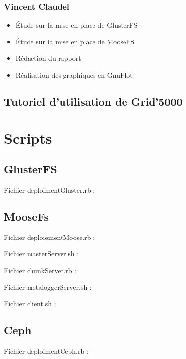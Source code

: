 \documentclass[12pt]{report}
\begin{document}
				\subsection{Vincent Claudel}
					\begin{itemize}
						\item Étude sur la mise en place de GlusterFS
						\item Étude sur la mise en place de MooseFS
						\item Rédaction du rapport
						\item Réalisation des graphiques en GnuPlot
					\end{itemize}
		  \section{Tutoriel d'utilisation de Grid'5000}
		  \label{grid}
		  
		  
		  
			
		\chapter{Scripts}
			\section{GlusterFS}
				Fichier deploimentGluster.rb :
				
			\section{MooseFs}
                                Fichier deploiementMoose.rb :
                                
                                Fichier masterServer.sh :
                                
\newpage
                                Fichier chunkServer.rb :
                                
                                Fichier metaloggerServer.sh :
                                
                                Fichier client.sh :
                                
			\section{Ceph}
			\label{DepCeph}
				Fichier deploimentCeph.rb :
				
\end{document}
